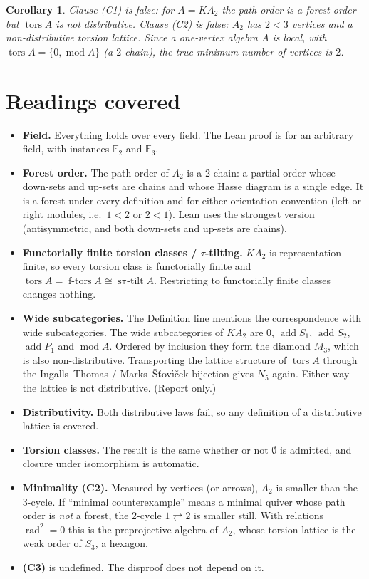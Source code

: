\documentclass[11pt]{article}
\newtheorem{corollary}[theorem]{Corollary}
\theoremstyle{definition}
\theoremstyle{remark}
\newcommand{\tors}{\operatorname{tors}}
\newcommand{\md}{\operatorname{mod}}
\begin{document}
\begin{corollary}
Clause (C1) is false: for $A=KA_2$ the path order is a forest order but $\tors A$ is not
distributive. Clause (C2) is false: $A_2$ has $2<3$ vertices and a non-distributive torsion
lattice. Since a one-vertex algebra $A$ is local, with $\tors A=\{0,\md A\}$ (a $2$-chain), the
true minimum number of vertices is $2$.
\end{corollary}

\section{Readings covered}

\begin{itemize}
\item \textbf{Field.} Everything holds over every field. The Lean proof is for an arbitrary
field, with instances $\mathbb F_2$ and $\mathbb F_3$.
\item \textbf{Forest order.} The path order of $A_2$ is a 2-chain: a partial order whose down-sets
and up-sets are chains and whose Hasse diagram is a single edge. It is a forest under every
definition and for either orientation convention (left or right modules, i.e.\ $1<2$ or
$2<1$). Lean uses the strongest version (antisymmetric, and both down-sets and up-sets are chains).
\item \textbf{Functorially finite torsion classes / $\tau$-tilting.} $KA_2$ is
representation-finite, so every torsion class is functorially finite and
$\operatorname{tors}A=\operatorname{f\text{-}tors}A\cong\operatorname{s\tau\text{-}tilt}A$.
Restricting to functorially finite classes changes nothing.
\item \textbf{Wide subcategories.} The Definition line mentions the correspondence with wide
subcategories. The wide subcategories of $KA_2$ are $0$, $\operatorname{add}S_1$,
$\operatorname{add}S_2$, $\operatorname{add}P_1$ and $\operatorname{mod}A$. Ordered by inclusion
they form the diamond $M_3$, which is also non-distributive. Transporting the lattice structure of
$\operatorname{tors}A$ through the Ingalls--Thomas / Marks--\v{S}\v{t}ov\'{\i}\v{c}ek bijection
gives $N_5$ again. Either way the lattice is not distributive. (Report only.)
\item \textbf{Distributivity.} Both distributive laws fail, so any definition of a distributive
lattice is covered.
\item \textbf{Torsion classes.} The result is the same whether or not $\emptyset$ is admitted, and
closure under isomorphism is automatic.
\item \textbf{Minimality (C2).} Measured by vertices (or arrows), $A_2$ is smaller than the
3-cycle. If ``minimal counterexample'' means a minimal quiver whose path order is \emph{not} a
forest, the 2-cycle $1\rightleftarrows2$ is smaller still. With relations
$\operatorname{rad}^2=0$ this is the preprojective algebra of $A_2$, whose torsion lattice is the
weak order of $S_3$, a hexagon.
\item \textbf{(C3)} is undefined. The disproof does not depend on it.
\end{itemize}
\end{document}
